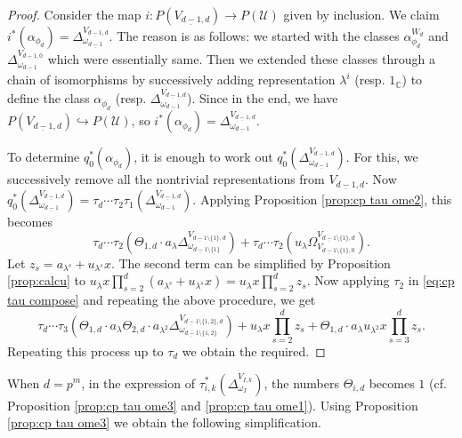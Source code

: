 \documentclass[a4paper,leqno,11pt]{amsart}
\theoremstyle{plain}
\theoremstyle{definition}
\theoremstyle{remark}
\theoremstyle{definition}
\newcommand{\C}{{\mathbb C}}
\newenvironment{myeq}[1][]
{\stepcounter{theorem}\begin{equation}\tag{\thetheorem}{#1}}
	{\end{equation}}
\def\C{\mathbb{C}}
\numberwithin{equation}{section}
\begin{document}
	\begin{proof}
		Consider the map $i: P(V_{\underline{d-1},d})\rightarrow P(\mathcal{U}) $ given by inclusion. We claim $ i^*(\alpha_{\phi_d})=\Delta_{\omega _{\underline{d-1}}}^{V_{\underline{d-1},d}} $. The reason is as follows: we started with  the classes $\alpha_{\phi_d}^{W_d}  $ and $ \Delta_{\omega _{\underline{d-1}}}^{V_{\underline{d-1},0}}$ which were essentially same.  Then we  extended these classes through a chain of isomorphisms by successively adding representation $ \lambda^i$  (resp. $ 1_\C $) to define the class $ \alpha _{\phi_d} $ (resp. $ \Delta_{\omega _{\underline{d-1}}}^{V_{\underline{d-1},d}} $). Since in the end, we have $ P(V_{\underline{d-1},d})\hookrightarrow P(\mathcal{U}) $, so $ i^*(\alpha_{\phi_d})=\Delta_{\omega _{\underline{d-1}}}^{V_{\underline{d-1},d}} $.\par
		To determine $ q_0^*(\alpha_{\phi_d})$,  it is enough to work out $ q_0^*(\Delta_{\omega _{\underline{d-1}}}^{V_{\underline{d-1},d}} )$. For this, we successively remove all the nontrivial representations from   	$ V_{\underline{d-1},d} $.  Now   $ q_0^*(\Delta_{\omega _{\underline{d-1}}}^{V_{\underline{d-1},d}} )=\tau_d	 \cdots\tau _2\tau_{1}(\Delta_{\omega _{\underline{d-1}}}^{V_{\underline{d-1},d}} ) $. Applying  Proposition \ref{prop:cp tau ome2}, this becomes
		\begin{myeq}\label{eq:cp tau compose}
			\tau _d \cdots\tau _2(\Theta_{1,d}\cdot a_{\lambda} \Delta_{\omega_{{\underline{d-1}}\setminus\{ 1\}} }^{V_{\underline{d-1}\setminus \{1\},d}})+\tau _d \cdots\tau _2(u_{\lambda}\Omega_{V_{\underline{d-1}\setminus\{ 1\},0} }^{V_{\underline{d-1}\setminus \{1\},d}}).
		\end{myeq}  
		Let $ z_s=a_{\lambda^s}+u_{\lambda^s} x$.	The   second term can be simplified by Proposition \ref{prop:calcu} to
		$ 	u_\lambda x \prod_{s=2}^{d} (a_{\lambda^s}+u_{\lambda^s}x)=u_\lambda x \prod_{s=2}^{d} z_s.$
		Now applying $ \tau _2 $ in \eqref{eq:cp tau compose} and repeating the  above procedure,  we get
		\[
		\tau _d \cdots\tau _3(\Theta_{1,d}\cdot a_{\lambda}\Theta_{2,d}\cdot a_{\lambda^2} \Delta_{\omega_{{\underline{d-1}}\setminus\{ 1,2\}} }^{V_{\underline{d-1}\setminus \{1,2\},d}})+u_\lambda x \prod_{s=2}^{d} z_s+\Theta_{1,d}\cdot a_\lambda u_{\lambda^2} x \prod_{s=3}^{d} z_s.
		\]
		Repeating this process up to $ \tau_d $ we obtain the required.
	\end{proof}
	When $ d=p^m $, in the expression of  $ \tau_{i,k}^*(\Delta^{V_{I,k}}_{\omega _I}) $,  the numbers $ \Theta_{i,d} $ becomes $ 1 $   (cf. Proposition \ref{prop:cp tau ome3} and  \ref{prop:cp tau ome1}). Using Proposition \ref{prop:cp tau ome3} we obtain the following simplification.
\end{document}
